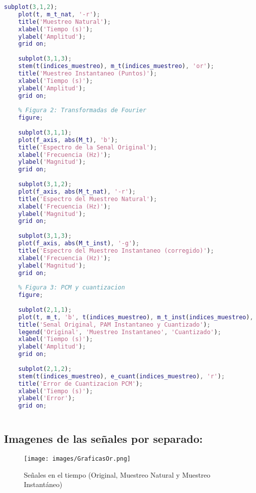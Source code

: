 \documentclass[12pt]{article}
\begin{document}
\begin{lstlisting}[language=MATLAB, caption=Código en MATLAB, label=lst:codigo]
    subplot(3,1,2);
    plot(t, m_t_nat, '-r');
    title('Muestreo Natural');
    xlabel('Tiempo (s)');
    ylabel('Amplitud');
    grid on;
    
    subplot(3,1,3);
    stem(t(indices_muestreo), m_t(indices_muestreo), 'or');
    title('Muestreo Instantaneo (Puntos)');
    xlabel('Tiempo (s)');
    ylabel('Amplitud');
    grid on;
    
    % Figura 2: Transformadas de Fourier
    figure;
    
    subplot(3,1,1);
    plot(f_axis, abs(M_t), 'b');
    title('Espectro de la Senal Original');
    xlabel('Frecuencia (Hz)');
    ylabel('Magnitud');
    grid on;
    
    subplot(3,1,2);
    plot(f_axis, abs(M_t_nat), '-r');
    title('Espectro del Muestreo Natural');
    xlabel('Frecuencia (Hz)');
    ylabel('Magnitud');
    grid on;
    
    subplot(3,1,3);
    plot(f_axis, abs(M_t_inst), '-g');
    title('Espectro del Muestreo Instantaneo (corregido)');
    xlabel('Frecuencia (Hz)');
    ylabel('Magnitud');
    grid on;
    
    % Figura 3: PCM y cuantizacion
    figure;
    
    subplot(2,1,1);
    plot(t, m_t, 'b', t(indices_muestreo), m_t_inst(indices_muestreo), 'or', t(indices_muestreo), m_t_cuant(indices_muestreo), 'xg');
    title('Senal Original, PAM Instantaneo y Cuantizado');
    legend('Original', 'Muestreo Instantaneo', 'Cuantizado');
    xlabel('Tiempo (s)');
    ylabel('Amplitud');
    grid on;
    
    subplot(2,1,2);
    stem(t(indices_muestreo), e_cuant(indices_muestreo), 'r');
    title('Error de Cuantizacion PCM');
    xlabel('Tiempo (s)');
    ylabel('Error');
    grid on;
    

\end{lstlisting}

\newpage

\subsection*{Imagenes de las señales por separado:}

\begin{figure}[!h]
    \centering
    \texttt{[image: images/GraficasOr.png]}
    \caption{Señales en el tiempo (Original, Muestreo Natural y Muestreo Instantáneo)}
    \label{fig:signals_time}
\end{figure}
\end{document}
